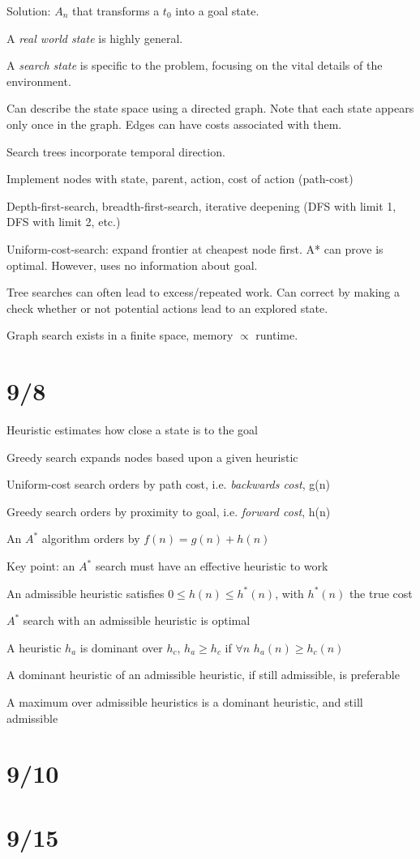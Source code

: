 \documentclass[12pt]{article}
\begin{document}
Solution: ${A_n}$ that transforms a $t_0$ into a goal state.

A \textit{real world state} is highly general.

A \textit{search state} is specific to the problem, focusing on the vital details of the environment.

Can describe the state space using a directed graph.  Note that each state appears only once in the graph.  Edges can have costs associated with them.

Search trees incorporate temporal direction.

Implement nodes with state, parent, action, cost of action (path-cost)

Depth-first-search, breadth-first-search, iterative deepening (DFS with limit 1, DFS with limit 2, etc.)

Uniform-cost-search: expand frontier at cheapest node first. A* can prove is optimal. However, uses no information about goal.

Tree searches can often lead to excess/repeated work.  Can correct by making a check whether or not potential actions lead to an explored state.

Graph search exists in a finite space, memory $\propto$ runtime.

\section{9/8}

Heuristic estimates how close a state is to the goal

Greedy search expands nodes based upon a given heuristic

Uniform-cost search orders by path cost, i.e. \textit{backwards cost}, g(n)

Greedy search orders by proximity to goal, i.e. \textit{forward cost}, h(n)

An $A^*$ algorithm orders by $f(n) = g(n) + h(n)$

Key point: an $A^*$ search must have an effective heuristic to work

An admissible heuristic satisfies $0 \leq h(n) \leq h^*(n)$, with $h^*(n)$ the true cost

$A^*$ search with an admissible heuristic is optimal

A heuristic $h_a$ is dominant over $h_c$, $h_a \geq h_c$ if $\forall n$ $h_a(n) \geq h_c(n)$

A dominant heuristic of an admissible heuristic, if still admissible, is preferable

A maximum over admissible heuristics is a dominant heuristic, and still admissible

\section{9/10}



\section{9/15}
\end{document}
